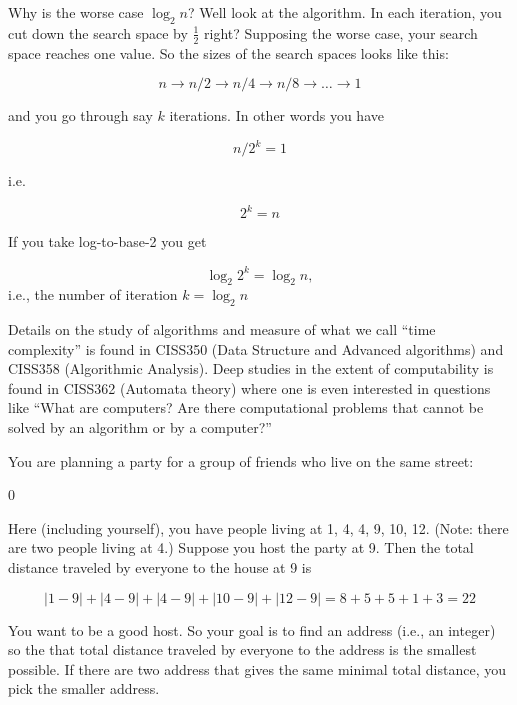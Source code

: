 Why is the worse case $\log_{2}n$? Well look at the algorithm. In each iteration, you cut down the search space by $\frac{1}{2}$ right? Supposing the worse case, your search space reaches one value. So the sizes of the search spaces looks like this:
\begin{center}
\[n \rightarrow n/2 \rightarrow n/4 \rightarrow n/8 \rightarrow \ldots \rightarrow 1\]
\end{center}
and you go through say $k$ iterations. In other words you have
\begin{center}
\[n/2^{k} = 1\]
\end{center}
i.e.
\begin{center}
\[2^{k} = n\]
\end{center}
If you take log-to-base-2 you get
\begin{center}
\[\log_{2}2^{k} = \log_{2}n,\]
i.e., the number of iteration $k = \log_{2}n$
\end{center}
Details on the study of algorithms and measure of what we call ``time complexity'' is found in CISS350 (Data Structure and Advanced algorithms) and CISS358 (Algorithmic Analysis). Deep studies in the extent of computability is found in CISS362 (Automata theory) where one is even interested in questions like ``What are computers? Are there computational problems that cannot be solved by an algorithm or by a computer?''

\newpage{}

You are planning a party for a group of friends who live on the same
street:


\begin{center}
0            
\end{center}

Here (including yourself), you have people living at 1, 4, 4, 9, 10, 12. (Note: there are two people living at 4.) Suppose you host the party at 9. Then the total distance traveled by everyone to the house at 9 is
\begin{center}
\[|1 - 9| + |4 - 9| + |4 - 9| + |10 - 9| + |12 - 9| = 8 + 5 + 5 + 1 + 3 = 22\]
\end{center}
You want to be a good host. So your goal is to find an address (i.e., an integer) so the that total distance traveled by everyone to the address is the smallest possible. If there are two address that gives the same minimal total distance, you pick the smaller address.

